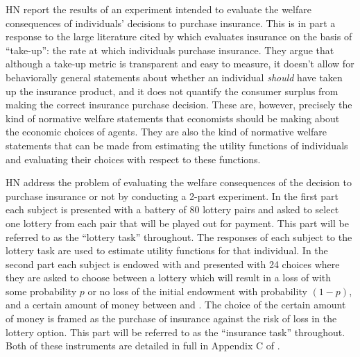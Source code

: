 \documentclass[../main.tex]{subfiles}
\begin{document}
HN report the results of an experiment intended to evaluate the welfare consequences of individuals' decisions to purchase insurance.
This is in part a response to the large literature cited by \textcite[92]{Harrison2016} which evaluates insurance on the basis of \enquote{take-up}: the rate at which individuals purchase insurance.
They argue that although a take-up metric is transparent and easy to measure, it doesn't allow for behaviorally general statements about whether an individual \textit{should} have taken up the insurance product, and it does not quantify the consumer surplus from making the correct insurance purchase decision.
These are, however, precisely the kind of normative welfare statements that economists should be making about the economic choices of agents.
They are also the kind of normative welfare statements that can be made from estimating the utility functions of individuals and evaluating their choices with respect to these functions.

HN address the problem of evaluating the welfare consequences of the decision to purchase insurance or not by conducting a 2-part experiment.
In the first part each subject is presented with a battery of 80 lottery pairs and asked to select one lottery from each pair that will be played out for payment.
This part will be referred to as the \enquote{lottery task} throughout.
The responses of each subject to the lottery task are used to estimate utility functions for that individual.
In the second part each subject is endowed with  and presented with 24 choices where they are asked to choose between a lottery which will result in a loss of  with some probability $p$ or no loss of the initial endowment with probability $(1-p)$, and a certain amount of money between  and .
The choice of the certain amount of money is framed as the purchase of insurance against the risk of loss in the lottery option.
This part will be referred to as the \enquote{insurance task} throughout.
Both of these instruments are detailed in full in Appendix C of \textcite{Harrison2016}.
\end{document}
